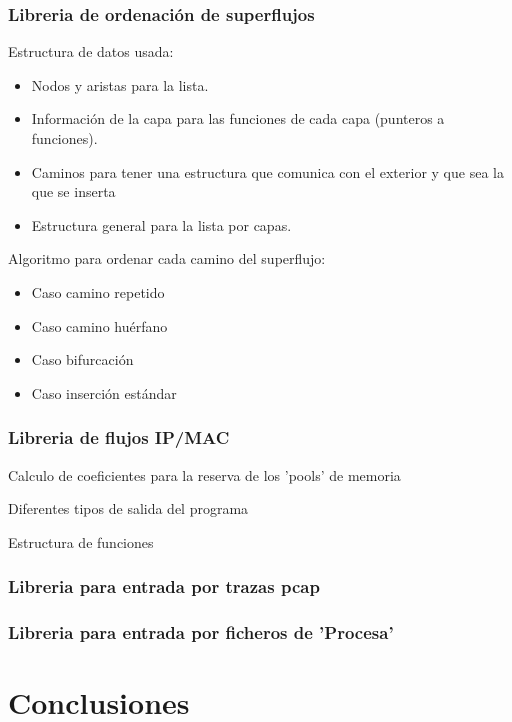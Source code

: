 \documentclass[twoside, 12pt]{epstfg}
\begin{document}
\subsection{Libreria de ordenación de superflujos}

Estructura de datos usada:
\begin{itemize} 
\item Nodos y aristas para la lista. 
\item Información de la capa para las funciones de cada capa (punteros a funciones).
\item Caminos para tener una estructura que comunica con el exterior y que sea la que se inserta
\item Estructura general para la lista por capas.
\end{itemize}

Algoritmo para ordenar cada camino del superflujo:
\begin{itemize}
\item Caso camino repetido
\item Caso camino huérfano
\item Caso bifurcación
\item Caso inserción estándar
\end{itemize}

\subsection{Libreria de flujos IP/MAC}
Calculo de coeficientes para la reserva de los 'pools' de memoria

Diferentes tipos de salida del programa

Estructura de funciones

\subsection{Libreria para entrada por trazas pcap}


\subsection{Libreria para entrada por ficheros de 'Procesa'}



\chapter{Conclusiones}
\label{chap:Conclusiones}

\backmatter
\appendix

\cleardoublepage

\nocite{*}
{}

\cleardoublepage
\printindex
\end{document}
